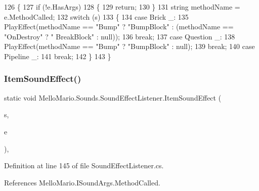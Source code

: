 \begin{DoxyCode}
126         \{
127             \textcolor{keywordflow}{if} (!e.HasArgs)
128             \{
129                 \textcolor{keywordflow}{return};
130             \}
131             \textcolor{keywordtype}{string} methodName = e.MethodCalled;
132             \textcolor{keywordflow}{switch} (s)
133             \{
134                 \textcolor{keywordflow}{case} Brick \_:
135                     PlayEffect(methodName == \textcolor{stringliteral}{"Bump"} ? \textcolor{stringliteral}{"BumpBlock"} : (methodName == \textcolor{stringliteral}{"OnDestroy"} ? \textcolor{stringliteral}{"
      BreakBlock"} : null));
136                     \textcolor{keywordflow}{break};
137                 \textcolor{keywordflow}{case} Question \_:
138                     PlayEffect(methodName == \textcolor{stringliteral}{"Bump"} ? \textcolor{stringliteral}{"BumpBlock"} : null);
139                     \textcolor{keywordflow}{break};
140                 \textcolor{keywordflow}{case} Pipeline \_:
141                     \textcolor{keywordflow}{break};
142             \}
143         \}
\end{DoxyCode}
\mbox{\label{classMelloMario_1_1Sounds_1_1SoundEffectListener_a2de34c3251637938e9f7b574cd8521d7}} 
\subsubsection{Item\+Sound\+Effect()}
{\footnotesize\ttfamily static void Mello\+Mario.\+Sounds.\+Sound\+Effect\+Listener.\+Item\+Sound\+Effect (\begin{DoxyParamCaption}\item[{\textbf{ I\+Soundable}}]{s,  }\item[{\textbf{ I\+Sound\+Args}}]{e }\end{DoxyParamCaption})\hspace{0.3cm}{\ttfamily [static]}, {\ttfamily [private]}}



Definition at line 145 of file Sound\+Effect\+Listener.\+cs.



References Mello\+Mario.\+I\+Sound\+Args.\+Method\+Called.


